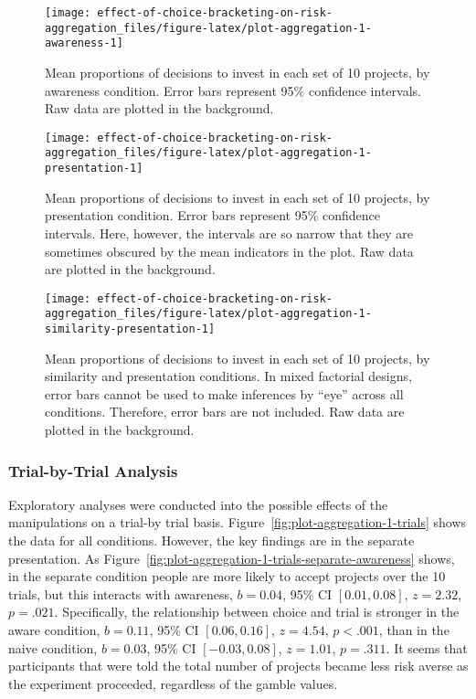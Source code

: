 \documentclass[
  english,
  man, donotrepeattitle,floatsintext]{apa7}
\theoremstyle{definition}
\theoremstyle{definition}
\theoremstyle{definition}
\theoremstyle{definition}
\theoremstyle{remark}
\begin{document}
\begin{figure}
\texttt{[image: effect-of-choice-bracketing-on-risk-aggregation\_files/figure-latex/plot-aggregation-1-awareness-1]} \caption{Mean proportions of decisions to invest in each set of 10 projects, by awareness condition. Error bars represent 95\% confidence intervals. Raw data are plotted in the background.}\label{fig:plot-aggregation-1-awareness}
\end{figure}



\begin{figure}
\texttt{[image: effect-of-choice-bracketing-on-risk-aggregation\_files/figure-latex/plot-aggregation-1-presentation-1]} \caption{Mean proportions of decisions to invest in each set of 10 projects, by presentation condition. Error bars represent 95\% confidence intervals. Here, however, the intervals are so narrow that they are sometimes obscured by the mean indicators in the plot. Raw data are plotted in the background.}\label{fig:plot-aggregation-1-presentation}
\end{figure}



\begin{figure}
\texttt{[image: effect-of-choice-bracketing-on-risk-aggregation\_files/figure-latex/plot-aggregation-1-similarity-presentation-1]} \caption{Mean proportions of decisions to invest in each set of 10 projects, by similarity and presentation conditions. In mixed factorial designs, error bars cannot be used to make inferences by ``eye'' across all conditions. Therefore, error bars are not included. Raw data are plotted in the background.}\label{fig:plot-aggregation-1-similarity-presentation}
\end{figure}

\hypertarget{trial-by-trial-analysis}{%
\subsubsection{Trial-by-Trial Analysis}\label{trial-by-trial-analysis}}

Exploratory analyses were conducted into the possible effects of the
manipulations on a trial-by trial basis.
Figure~\ref{fig:plot-aggregation-1-trials} shows the data for all conditions.
However, the key findings are in the separate presentation. As
Figure~\ref{fig:plot-aggregation-1-trials-separate-awareness} shows, in the
separate condition people are more likely to accept projects over the 10 trials,
but this interacts with awareness,
\(b = 0.04\), 95\% CI \([0.01, 0.08]\), \(z = 2.32\), \(p = .021\).
Specifically, the relationship between choice and trial is stronger in the aware
condition,
\(b = 0.11\), 95\% CI \([0.06, 0.16]\), \(z = 4.54\), \(p < .001\), than in the
naive condition,
\(b = 0.03\), 95\% CI \([-0.03, 0.08]\), \(z = 1.01\), \(p = .311\). It seems that
participants that were told the total number of projects became less risk averse
as the experiment proceeded, regardless of the gamble values.
\end{document}
